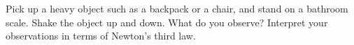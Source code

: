  Pick up a heavy object such as a backpack or a chair,
and stand on a bathroom scale. Shake the object up and down.
What do you observe? Interpret your observations in terms
of Newton's third law.
